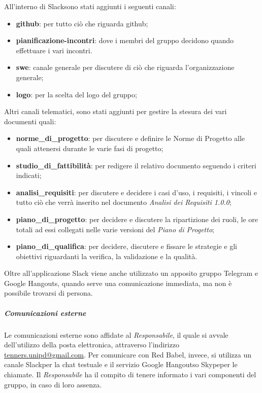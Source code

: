    					All'interno di Slack\glo sono stati aggiunti i seguenti canali:
   					\begin{itemize}
   						\item \textbf{github}: per tutto ciò che riguarda github;
   						\item \textbf{pianificazione-incontri}: dove i membri del gruppo decidono quando effettuare i vari incontri.
   						\item \textbf{swe}: canale generale per discutere di ciò che riguarda l'organizzazione generale;
   						\item \textbf{logo}: per la scelta del logo del gruppo;

   					\end{itemize}
   					Altri canali telematici, sono stati aggiunti per gestire la stesura dei vari documenti quali:
   					\begin{itemize}
   						\item \textbf{norme\_di\_progetto}: per discutere e definire le Norme di Progetto alle quali attenersi durante le varie fasi di progetto;
   						\item \textbf{studio\_di\_fattibilità}: per redigere il relativo documento seguendo i criteri indicati;
   						\item \textbf{analisi\_requisiti}: per discutere e decidere i casi d'uso, i requisiti, i vincoli e tutto ciò che verrà inserito nel documento \textit{Analisi dei Requisiti 1.0.0\docs};
   						\item \textbf{piano\_di\_progetto}: per decidere e discutere la ripartizione dei ruoli, le ore totali ad essi collegati nelle varie versioni del \textit{Piano di Progetto\docs};
   						\item \textbf{piano\_di\_qualifica}: per decidere, discutere e fissare le strategie e gli obiettivi riguardanti la verifica, la validazione e la qualità.
   					\end{itemize}
   					Oltre all'applicazione Slack viene anche utilizzato un apposito gruppo Telegram e Google Hangouts, quando serve una comunicazione immediata, ma non è possibile trovarsi di persona.
   				\subparagraph{Comunicazioni esterne}
   					Le comunicazioni esterne sono affidate al \textit{Responsabile}, il quale si avvale dell'utilizzo della posta elettronica, attraverso l'indirizzo \href{mailto:tenners.unipd@gmail.com}{tenners.unipd@gmail.com}.
   					Per comunicare con Red Babel, invece, si utilizza un canale Slack\glo per la chat testuale e il servizio Google Hangouts\glos o Skype\glo per le chiamate.
   					Il \textit{Responsabile} ha il compito di tenere informato i vari componenti del gruppo, in caso di loro assenza.
